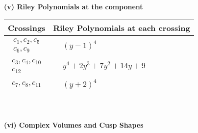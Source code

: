 \documentclass[1p]{elsarticle_modified}
\theoremstyle{definition}
\begin{document}
\newpage\renewcommand{\arraystretch}{1}
\flushleft \textbf{(v) Riley Polynomials at the component}\newline \\
\begin{tabular}{m{50pt}|m{274pt}}
Crossings & \hspace{64pt}Riley Polynomials at each crossing \\
\hline $$\begin{aligned}c_{1},c_{2},c_{5}\\c_{6},c_{9}\end{aligned}$$&$\begin{aligned}
&(y-1)^4
\end{aligned}$\\
\hline $$\begin{aligned}c_{3},c_{4},c_{10}\\c_{12}\end{aligned}$$&$\begin{aligned}
&y^4+2 y^3+7 y^2+14 y+9
\end{aligned}$\\
\hline $$\begin{aligned}c_{7},c_{8},c_{11}\end{aligned}$$&$\begin{aligned}
&(y+2)^4
\end{aligned}$\\
\hline
\end{tabular}\\~\\
\newpage\flushleft \textbf{(vi) Complex Volumes and Cusp Shapes}
\end{document}
